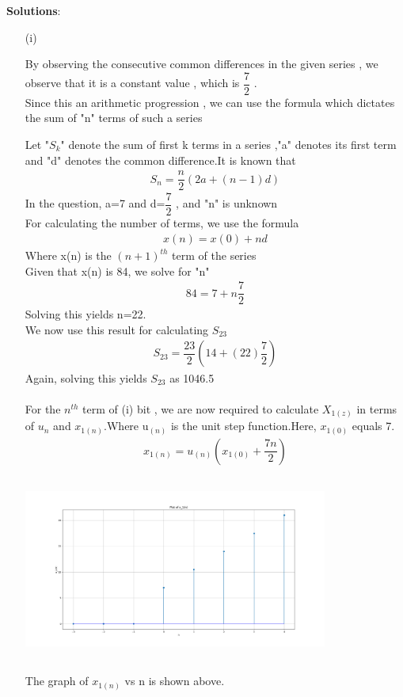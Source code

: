\documentclass[journal,12pt,twocolumn]{IEEEtran}
\theoremstyle{remark}
\begin{document}
\vspace{0.5cm}
\textbf{Solutions}:
\begin{enumerate}
\item[(i)]   

By observing the consecutive common differences in the given series , we observe that it is a constant value , which is $\dfrac{7}{2}$ .\\
Since this an arithmetic progression , we can use the formula which dictates the sum of "n" terms of such a series

Let "$S_{k}$" denote the sum of first k terms in a series ,"a" denotes its first term and "d" denotes the common difference.It is known that
\begin{align}
{S_n} = \dfrac{n}{2}(2a + (n-1)d)\label{eq:1}
\end{align}
In the question, a=7 and d=$\dfrac{7}{2}$ , and "n" is unknown\\
For calculating the number of terms, we use the formula
\begin{align}
x(n) = x(0) + nd\label{eq:2}
\end{align}
Where x(n) is the $(n+1)^{th}$ term of the series\\
Given that x(n) is 84, we solve for "n"
\begin{align}  
84 = 7+n\dfrac{7}{2}
\end{align}
Solving this yields n=22.\\
We now use this result for calculating $S_{23}$
\begin{align}
    S_{23} = \dfrac{23}{2}(14+(22)\dfrac{7}{2})
    \end{align}
Again, solving this yields $S_{23}$ as 1046.5\\\\
For the $n^{th}$ term of (i) bit , we are now required to calculate $X_{1(z)}$ in terms of $u_n$ and $x_{1(n)}$.Where u$_{(n)}$ is the unit step function.Here, $x_{1(0)}$ equals 7.\\
\begin{align}
    x_{1(n)} = u_{(n)}(x_{1(0)}+\dfrac{7n}{2})
    \end{align}
\graphicspath{ {figs/} }
\includegraphics[width=10cm, height=6cm]{graph_1}
\caption{The graph of $x_{1(n)}$ vs n is shown above.}\\
\label{graph:1}


\end{enumerate}
\end{document}
